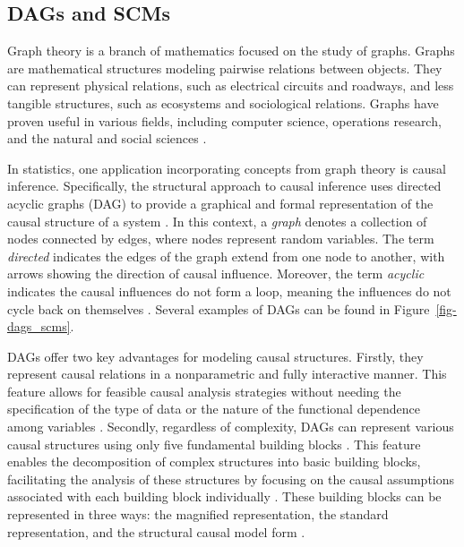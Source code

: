 \documentclass[
  authoryear,
  preprint,
  1p]{elsarticle}
\begin{document}
\subsection{DAGs and SCMs}\label{sec-framework-dag}

Graph theory is a branch of mathematics focused on the study of graphs.
Graphs are mathematical structures modeling pairwise relations between
objects. They can represent physical relations, such as electrical
circuits and roadways, and less tangible structures, such as ecosystems
and sociological relations. Graphs have proven useful in various fields,
including computer science, operations research, and the natural and
social sciences \citep{Gross_et_al_2018}.

In statistics, one application incorporating concepts from graph theory
is causal inference. Specifically, the structural approach to causal
inference uses directed acyclic graphs (DAG) to provide a graphical and
formal representation of the causal structure of a system
\citep{Neal_2020}. In this context, a \emph{graph} denotes a collection
of nodes connected by edges, where nodes represent random variables. The
term \emph{directed} indicates the edges of the graph extend from one
node to another, with arrows showing the direction of causal influence.
Moreover, the term \emph{acyclic} indicates the causal influences do not
form a loop, meaning the influences do not cycle back on themselves
\citep{McElreath_2020}. Several examples of DAGs can be found in
Figure~\ref{fig-dags_scms}.

DAGs offer two key advantages for modeling causal structures. Firstly,
they represent causal relations in a nonparametric and fully interactive
manner. This feature allows for feasible causal analysis strategies
without needing the specification of the type of data or the nature of
the functional dependence among variables \citep{Morgan_et_al_2014}.
Secondly, regardless of complexity, DAGs can represent various causal
structures using only five fundamental building blocks
\citep{Neal_2020, McElreath_2020}. This feature enables the
decomposition of complex structures into basic building blocks,
facilitating the analysis of these structures by focusing on the causal
assumptions associated with each building block individually
\citep{McElreath_2020}. These building blocks can be represented in
three ways: the magnified representation, the standard representation,
and the structural causal model form \citep[SCM,][]{Morgan_et_al_2014}.

\newcommand{\dsep}{\perp\!\!\!\perp}
\newcommand{\ndsep}{\not\!\perp\!\!\!\perp}
\end{document}
